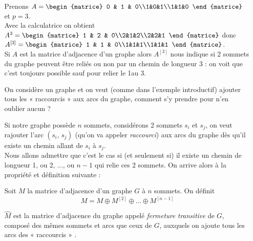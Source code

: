 \begin{exemple}[]
    Prenons $A =\begin{matrice}
            0 & 1 & 0\\1&0&1\\1&1&0
        \end{matrice}$ et $p=3$.\\
    Avec la calculatrice on obtient $A^3 =\begin{matrice}
            1 & 2 & 0\\2&1&2\\2&2&1
        \end{matrice}$ donc $A^{[3]} =\begin{matrice}
            1 & 1 & 0\\1&1&1\\1&1&1
        \end{matrice}$.\\
    
    Si $A$ est la matrice d'adjacence d'un graphe alors $A^{[3]}$ nous indique si 2 sommets du graphe peuvent être reliés ou non par un chemin de longueur 3 : on voit que c'est toujours possible sauf pour relier le 1\er au 3\eme.
\end{exemple}

On considère un graphe et on veut (comme dans l'exemple introductif) ajouter tous les  «  raccourcis »  aux arcs du graphe, comment s'y prendre pour n'en oublier aucun ?

Si notre graphe possède $n$ sommets, considérons 2 sommets $s_i$ et $s_j$, on veut rajouter l'arc $(s_i,\, s_j)$ (qu'on va appeler \textit{raccourci}) aux arcs du graphe dès qu'il existe un chemin allant de $s_i$ à $s_j$.\\
Nous allons admettre que c'est le cas si (et seulement si) il existe un chemin de longueur 1, ou 2, ..., ou $n-1$ qui relie ces 2 sommets. On arrive alors à la propriété et définition suivante :

\begin{propriete}[ et définition]
    Soit $M$ la matrice d'adjacence d'un graphe $G$ à $n$ sommets. On définit
    $$\widehat{M}=M\oplus M^{[2]}\oplus\ldots\oplus M^{[n-1]}$$
    
    $\widehat{M}$ est la matrice d'adjacence du graphe appelé \textit{fermeture transitive} de $G$, composé des mêmes sommets et arcs que ceux de $G$, auxquels on ajoute tous les arcs des  «  raccourcis » .
\end{propriete}

